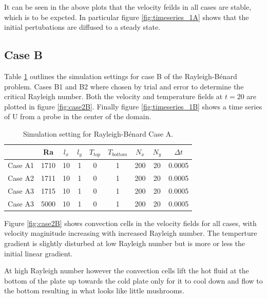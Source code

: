 \documentclass[10pt,a4paper]{article}
\begin{document}
It can be seen in the above plots that the velocity feilds in all cases are stable, which is to be expcted. In particular figure \ref{fig:timeseries_1A} shows that the initial pertubations are diffused to a steady state. 

\subsection{Case B}

Table \ref{tbl:part2B} outlines the simulation settings for case B of the Rayleigh-Bénard problem. Cases B1 and B2 where chosen by trial and error to determine the critical Rayleigh number. Both the velocity and temperature fields at $t = 20$ are plotted in figure \ref{fig:case2B}. Finally figure \ref{fig:timeseries_1B} shows a time series of U from a probe in the center of the domain.

 
\begin{table}[H]
\centering
\begin{tabular}{c|cccccccc}
 & Ra & $l_x$ & $l_y$ & $T_{top}$ &$ T_{bottom}$ & $N_x$ & $N_y$ & $\Delta t$ \\ 
\hline 
Case A1 & 1710& 10 & 1& 0 & 1  & 200 & 20 & 0.0005 \\ 

Case A2 & 1711 & 10 & 1& 0 & 1  & 200 & 20 & 0.0005 \\ 
 
Case A3 & 1715 & 10 & 1& 0 & 1  & 200 & 20 & 0.0005 \\ 

Case A3 & 5000 & 10 & 1& 0 & 1  & 200 & 20 & 0.0005 \\

\end{tabular} 
\caption{Simulation setting for Rayleigh-Bénard Case A.}
\label{tbl:part2B}
\end{table}

Figure \ref{fig:case2B} shows convection cells in the velocity fields for all cases, with velocity maginitude increasing with increased Rayleigh number. The temperture gradient is slightly disturbed at low Rayleigh number but is more or less the initial linear gradient.

At high Rayleigh number however the convection cells lift the hot fluid at the bottom of the plate up towards the cold plate only for it to cool down and flow to the bottom resulting in what looks like little mushrooms.
\end{document}
